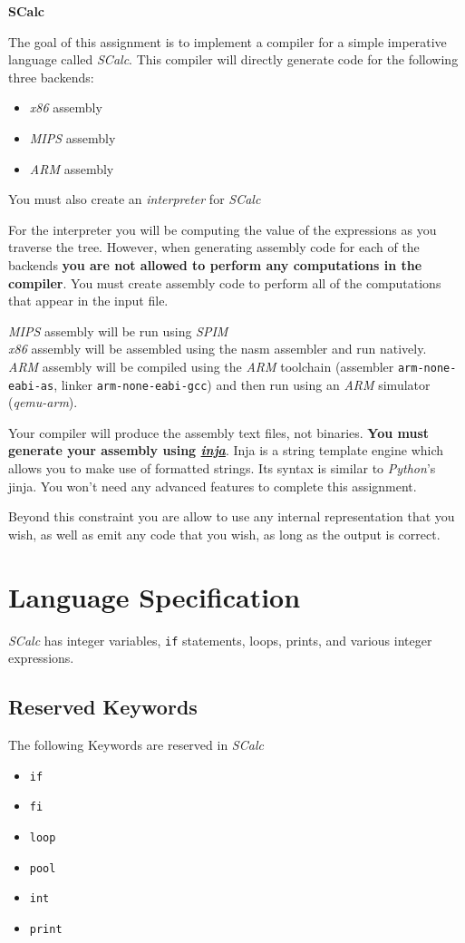 \documentclass{article}
\newcommand{\code}[1]{\texttt{\textmd{#1}}}
\begin{document}
\ifpdf
  \LARGE
  \textbf{SCalc}
  \normalsize
\fi

The goal of this assignment is to implement a compiler for a simple imperative language called
\textit{SCalc}. This compiler will directly generate code for the following three backends:
\begin {itemize}
  \item \textit{x86} assembly
  \item \textit{MIPS} assembly
  \item \textit{ARM} assembly
\end {itemize}
You must also create an \textit{interpreter} for \textit{SCalc}

For the interpreter you will be computing the value of the expressions as you traverse the tree.
However, when generating assembly code for each of the backends \textbf{you are not allowed to
perform any computations in the compiler}. You must create assembly code to perform all of the
computations that appear in the input file.

\textit{MIPS} assembly will be run using \textit{SPIM}\\
\textit{x86} assembly will be assembled using the nasm assembler and run natively.\\
\textit{ARM} assembly will be compiled using the \textit{ARM} toolchain (assembler
\code{arm-none-eabi-as}, linker \code{arm-none-eabi-gcc}) and then run using an \textit{ARM}
simulator (\textit{qemu-arm}).

Your compiler will produce the assembly text files, not binaries. \textbf{You must generate your
assembly using \href{https://github.com/pantor/inja}{\textit{inja}}}. Inja is a string template
engine which allows you to make use of formatted strings. Its syntax is similar to
\textit{Python}'s jinja. You won't need any advanced features to complete this assignment.

Beyond this constraint you are allow to use any internal representation that you wish, as well as
emit any code that you wish, as long as the output is correct.

\section{Language Specification}
\textit{SCalc} has integer variables, \code{if} statements, loops, prints, and various integer expressions.
\subsection{Reserved Keywords}
The following Keywords are reserved in \textit{SCalc}
\begin {itemize}
  \item{\code{if}}
  \item{\code{fi}}
  \item{\code{loop}}
  \item{\code{pool}}
  \item{\code{int}}
  \item{\code{print}}
\end {itemize}
\end{document}
